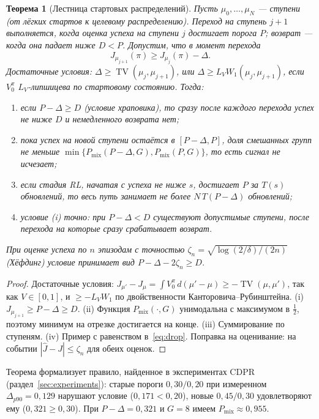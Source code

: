 \documentclass[11pt,a4paper]{article}
\theoremstyle{plain}
\newtheorem{theorem}{Теорема}[section]
\theoremstyle{definition}
\theoremstyle{remark}
\DeclareMathOperator{\TV}{TV}
\newcommand{\Pmix}{P_{\mathrm{mix}}}
\begin{document}
\begin{theorem}[Лестница стартовых распределений]\label{thm:ladder}
Пусть $\mu_0,\dots,\mu_N$ --- ступени (от лёгких стартов к целевому распределению). Переход на ступень $j+1$ выполняется, когда оценка успеха на ступени $j$ достигает порога $P$; возврат --- когда она падает ниже $D<P$. Допустим, что в момент перехода
\begin{equation}\label{eq:drop}
J_{\mu_{j+1}}(\pi)\ge J_{\mu_j}(\pi)-\Delta .
\end{equation}
Достаточные условия: $\Delta\ge\TV(\mu_j,\mu_{j+1})$, или $\Delta\ge L_VW_1(\mu_j,\mu_{j+1})$, если $V^\pi_0$ $L_V$-липшицева по стартовому состоянию. Тогда:
\begin{enumerate}[label=(\roman*)]
\item если $P-\Delta\ge D$ (\emph{условие храповика}), то сразу после каждого перехода успех не ниже $D$ и немедленного возврата нет;
\item пока успех на новой ступени остаётся в $[P-\Delta,P]$, доля смешанных групп не меньше $\min\{\Pmix(P-\Delta,G),\Pmix(P,G)\}$, то есть сигнал не исчезает;
\item если стадия RL, начатая с успеха не ниже $s$, достигает $P$ за $T(s)$ обновлений, то весь путь занимает не более $N\,T(P-\Delta)$ обновлений;
\item условие (i) точно: при $P-\Delta<D$ существуют допустимые ступени, после перехода на которые сразу срабатывает возврат.
\end{enumerate}
При оценке успеха по $n$ эпизодам с точностью $\zeta_n=\sqrt{\log(2/\delta)/(2n)}$ (Хёфдинг) условие принимает вид $P-\Delta-2\zeta_n\ge D$.
\end{theorem}
\begin{proof}
Достаточные условия: $J_{\mu'}-J_\mu=\int V^\pi_0\,d(\mu'-\mu)\ge-\TV(\mu,\mu')$, так как $V\in[0,1]$, и $\ge-L_VW_1$ по двойственности Канторовича--Рубинштейна.
(i) $J_{\mu_{j+1}}\ge P-\Delta\ge D$.
(ii) Функция $\Pmix(\cdot,G)$ унимодальна с максимумом в $\tfrac12$, поэтому минимум на отрезке достигается на конце.
(iii) Суммирование по ступеням.
(iv) Пример с равенством в~\eqref{eq:drop}.
Поправка на оценивание: на событии $|\hat J-J|\le\zeta_n$ для обеих оценок.
\end{proof}

Теорема формализует правило, найденное в экспериментах CDPR (раздел~\ref{sec:experiments}): старые пороги $0{,}30/0{,}20$ при измеренном $\Delta_{p90}=0{,}129$ нарушают условие ($0{,}171<0{,}20$), новые $0{,}45/0{,}30$ удовлетворяют ему ($0{,}321\ge0{,}30$). При $P-\Delta=0{,}321$ и $G=8$ имеем $\Pmix\approx0{,}955$.
\end{document}
